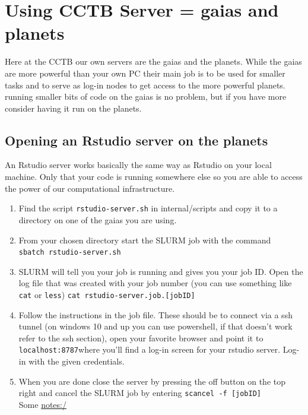 \documentclass[
]{book}
\begin{document}
\section{Using CCTB Server = gaias and planets}\label{using-cctb-server-gaias-and-planets}

Here at the CCTB our own servers are the gaias and the planets. While
the gaias are more powerful than your own PC their main job is to be
used for smaller tasks and to serve as log-in nodes to get access to the
more powerful planets. running smaller bits of code on the gaias is no
problem, but if you have more consider having it run on the planets.

\subsection{Opening an Rstudio server on the planets}\label{opening-an-rstudio-server-on-the-planets}

An Rstudio server works basically the same way as Rstudio on your local
machine. Only that your code is running somewhere else so you are able
to access the power of our computational infrastructure.

\begin{enumerate}
\def\labelenumi{\arabic{enumi}.}
\item
  Find the script \texttt{rstudio-server.sh} in internal/scripts and copy it
  to a directory on one of the gaias you are using.
\item
  From your chosen directory start the SLURM job with the command
  \texttt{sbatch\ rstudio-server.sh}
\item
  SLURM will tell you your job is running and gives you your job ID.
  Open the log file that was created with your job number (you can use
  something like \texttt{cat} or \texttt{less}) \texttt{cat\ rstudio-server.job.{[}jobID{]}}
\item
  Follow the instructions in the job file. These should be to connect
  via a ssh tunnel (on windows 10 and up you can use powershell, if
  that doesn't work refer to the ssh section), open your favorite
  browser and point it to \texttt{localhost:8787}where you'll find a log-in
  screen for your rstudio server. Log-in with the given credentials.
\item
  When you are done close the server by pressing the off button on the
  top right and cancel the SLURM job by entering \texttt{scancel\ -f\ {[}jobID{]}}\\
  Some \url{notes:/}
\end{enumerate}
\end{document}
